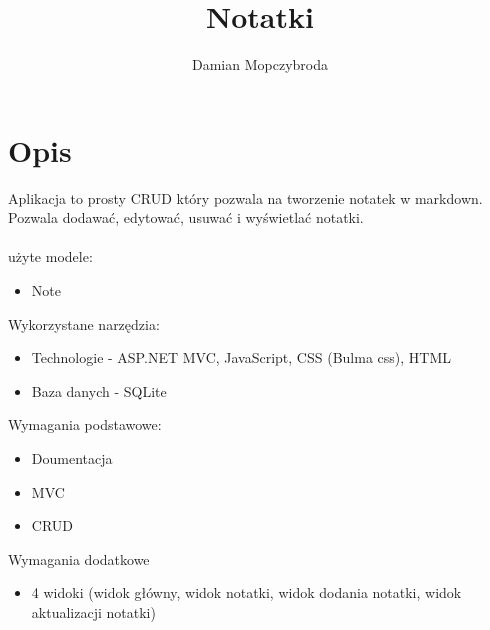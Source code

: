 \documentclass[]{article}
\title{Notatki}
\author{Damian Mopczybroda}
\begin{document}
\maketitle


\section*{Opis}
Aplikacja to prosty CRUD który pozwala na tworzenie notatek w markdown. Pozwala dodawać, edytować, usuwać i wyświetlać notatki.
\\\\
użyte modele:
\begin{itemize}
	\item Note
\end{itemize}
Wykorzystane narzędzia:
\begin{itemize}
	\item Technologie - ASP.NET MVC, JavaScript, CSS (Bulma css), HTML
	\item Baza danych - SQLite
\end{itemize}
Wymagania podstawowe:
\begin{itemize}
	\item Doumentacja
	\item MVC
	\item CRUD
\end{itemize}
Wymagania dodatkowe
\begin{itemize}
	\item 4 widoki (widok główny, widok notatki, widok dodania notatki, widok aktualizacji notatki)
\end{itemize}
\end{document}
